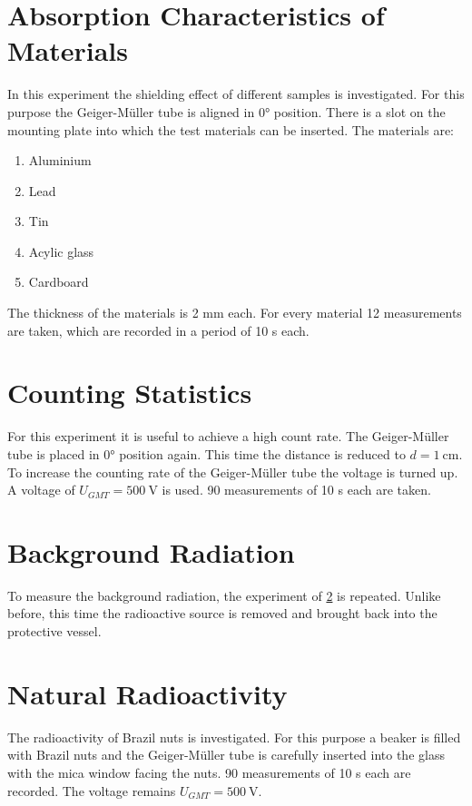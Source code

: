 \section{Absorption Characteristics of Materials}
In this experiment the shielding effect of different samples is investigated. For this purpose the Geiger-Müller tube is aligned in 0° position. There is a slot on the mounting plate into which the test materials can be inserted. The materials are:
\begin{enumerate}
	\item Aluminium
	\item Lead
	\item Tin
	\item Acylic glass
	\item Cardboard
\end{enumerate}
The thickness of the materials is 2 mm each. For every material 12 measurements are taken, which are recorded in a period of 10 s each.
%
\section{Counting Statistics} \label{sec:count_stat}
For this experiment it is useful to achieve a high count rate. The Geiger-Müller tube is placed in 0° position again. This time the distance is reduced to $d = 1\ \mathrm{cm}$. To increase the counting rate of the Geiger-Müller tube the voltage is turned up. A voltage of $U_{GMT} = 500\ \mathrm{V}$ is used. 90 measurements of 10 s each are taken.
%
\section{Background Radiation}
To measure the background radiation, the experiment of \ref{sec:count_stat} is repeated. Unlike before, this time the radioactive source is removed and brought back into the protective vessel.
%
\section{Natural Radioactivity}
%
The radioactivity of Brazil nuts is investigated. For this purpose a beaker is filled with Brazil nuts and the Geiger-Müller tube is carefully inserted into the glass with the mica window facing the nuts. 90 measurements of 10 s each are recorded. The voltage remains $U_{GMT} = 500\ \mathrm{V}$.

